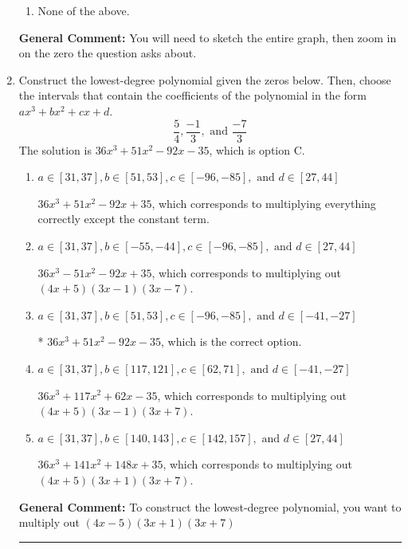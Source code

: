 \documentclass{extbook}[14pt]
\newcommand{\litem}[1]{\item #1

\rule{\textwidth}{0.4pt}}
\begin{document}
\begin{enumerate}
{\begin{enumerate}[label=\Alph*.]
\item None of the above.\end{enumerate}
\textbf{General Comment:} You will need to sketch the entire graph, then zoom in on the zero the question asks about.
}
\litem{
Construct the lowest-degree polynomial given the zeros below. Then, choose the intervals that contain the coefficients of the polynomial in the form $ax^3+bx^2+cx+d$.
\[ \frac{5}{4}, \frac{-1}{3}, \text{ and } \frac{-7}{3} \]The solution is \( 36x^{3} +51 x^{2} -92 x -35 \), which is option C.\begin{enumerate}[label=\Alph*.]
\item \( a \in [31, 37], b \in [51, 53], c \in [-96, -85], \text{ and } d \in [27, 44] \)

$36x^{3} +51 x^{2} -92 x + 35$, which corresponds to multiplying everything correctly except the constant term.
\item \( a \in [31, 37], b \in [-55, -44], c \in [-96, -85], \text{ and } d \in [27, 44] \)

$36x^{3} -51 x^{2} -92 x + 35$, which corresponds to multiplying out $(4x + 5)(3x -1)(3x -7)$.
\item \( a \in [31, 37], b \in [51, 53], c \in [-96, -85], \text{ and } d \in [-41, -27] \)

* $36x^{3} +51 x^{2} -92 x -35$, which is the correct option.
\item \( a \in [31, 37], b \in [117, 121], c \in [62, 71], \text{ and } d \in [-41, -27] \)

$36x^{3} +117 x^{2} +62 x -35$, which corresponds to multiplying out $(4x + 5)(3x -1)(3x + 7)$.
\item \( a \in [31, 37], b \in [140, 143], c \in [142, 157], \text{ and } d \in [27, 44] \)

$36x^{3} +141 x^{2} +148 x + 35$, which corresponds to multiplying out $(4x + 5)(3x + 1)(3x + 7)$.
\end{enumerate}

\textbf{General Comment:} To construct the lowest-degree polynomial, you want to multiply out $(4x -5)(3x + 1)(3x + 7)$
}
\end{enumerate}
\end{document}
